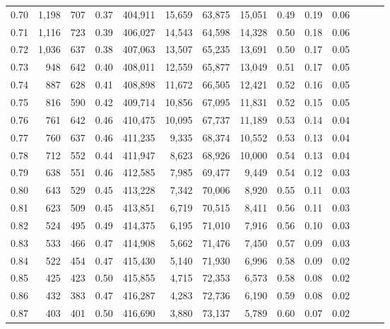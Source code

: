 \begin{tabular}{rrrrrrrrrrrrrr}
0.70 &   1,198 &    707 &  0.37 &  404,911 &   15,659 &  63,875 &  15,051 &  0.49 &  0.19 &      0.06 \\
0.71 &   1,116 &    723 &  0.39 &  406,027 &   14,543 &  64,598 &  14,328 &  0.50 &  0.18 &      0.06 \\
0.72 &   1,036 &    637 &  0.38 &  407,063 &   13,507 &  65,235 &  13,691 &  0.50 &  0.17 &      0.05 \\
0.73 &     948 &    642 &  0.40 &  408,011 &   12,559 &  65,877 &  13,049 &  0.51 &  0.17 &      0.05 \\
0.74 &     887 &    628 &  0.41 &  408,898 &   11,672 &  66,505 &  12,421 &  0.52 &  0.16 &      0.05 \\
0.75 &     816 &    590 &  0.42 &  409,714 &   10,856 &  67,095 &  11,831 &  0.52 &  0.15 &      0.05 \\
0.76 &     761 &    642 &  0.46 &  410,475 &   10,095 &  67,737 &  11,189 &  0.53 &  0.14 &      0.04 \\
0.77 &     760 &    637 &  0.46 &  411,235 &    9,335 &  68,374 &  10,552 &  0.53 &  0.13 &      0.04 \\
0.78 &     712 &    552 &  0.44 &  411,947 &    8,623 &  68,926 &  10,000 &  0.54 &  0.13 &      0.04 \\
0.79 &     638 &    551 &  0.46 &  412,585 &    7,985 &  69,477 &   9,449 &  0.54 &  0.12 &      0.03 \\
0.80 &     643 &    529 &  0.45 &  413,228 &    7,342 &  70,006 &   8,920 &  0.55 &  0.11 &      0.03 \\
0.81 &     623 &    509 &  0.45 &  413,851 &    6,719 &  70,515 &   8,411 &  0.56 &  0.11 &      0.03 \\
0.82 &     524 &    495 &  0.49 &  414,375 &    6,195 &  71,010 &   7,916 &  0.56 &  0.10 &      0.03 \\
0.83 &     533 &    466 &  0.47 &  414,908 &    5,662 &  71,476 &   7,450 &  0.57 &  0.09 &      0.03 \\
0.84 &     522 &    454 &  0.47 &  415,430 &    5,140 &  71,930 &   6,996 &  0.58 &  0.09 &      0.02 \\
0.85 &     425 &    423 &  0.50 &  415,855 &    4,715 &  72,353 &   6,573 &  0.58 &  0.08 &      0.02 \\
0.86 &     432 &    383 &  0.47 &  416,287 &    4,283 &  72,736 &   6,190 &  0.59 &  0.08 &      0.02 \\
0.87 &     403 &    401 &  0.50 &  416,690 &    3,880 &  73,137 &   5,789 &  0.60 &  0.07 &      0.02 \\

\end{tabular}
